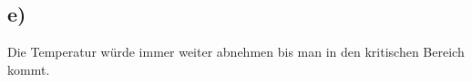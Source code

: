 

\subsection*{e)}
Die Temperatur würde immer weiter abnehmen bis man in den kritischen Bereich kommt.